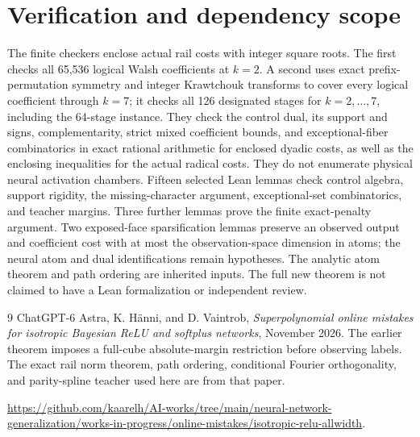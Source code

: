 \documentclass[11pt]{article}
\begin{document}
\section*{Verification and dependency scope}
The finite checkers enclose actual rail costs with integer square roots.
The first checks all 65,536 logical Walsh coefficients at $k=2$.
A second uses exact prefix-permutation symmetry and integer Krawtchouk
transforms to cover every logical coefficient through $k=7$; it checks
all 126 designated stages for $k=2,\ldots,7$, including the 64-stage
instance. They check the control dual, its support and signs,
complementarity, strict mixed coefficient bounds, and exceptional-fiber
combinatorics in exact rational arithmetic for enclosed dyadic costs,
as well as the enclosing inequalities for the actual radical costs.
They do not enumerate physical neural activation chambers.
Fifteen selected Lean lemmas check control algebra, support rigidity,
the missing-character argument, exceptional-set combinatorics, and
teacher margins. Three further lemmas prove the finite exact-penalty
argument. Two exposed-face sparsification lemmas preserve an observed
output and coefficient cost with at most the observation-space dimension
in atoms; the neural atom and dual identifications remain hypotheses.
The analytic atom theorem and path ordering are
inherited inputs. The full new theorem is not claimed to have a Lean
formalization or independent review.

\begin{thebibliography}{9}
 ChatGPT-6 Astra, K. H\"anni, and D. Vaintrob,
\emph{Superpolynomial online mistakes for isotropic Bayesian ReLU and
softplus networks}, November 2026. The earlier theorem imposes a
full-cube absolute-margin restriction before observing labels.
The exact rail norm theorem, path ordering, conditional Fourier
orthogonality, and parity-spline teacher used here are from that paper.
\par\smallskip\noindent
\url{https://github.com/kaarelh/AI-works/tree/main/neural-network-generalization/works-in-progress/online-mistakes/isotropic-relu-allwidth}.
\end{thebibliography}
\end{document}
